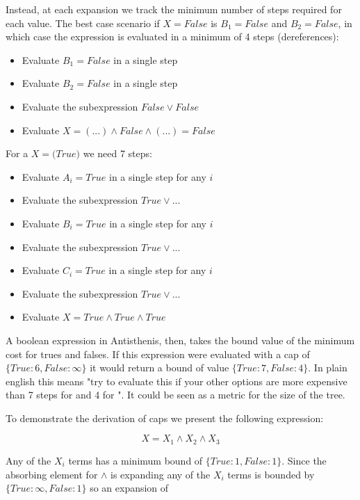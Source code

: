 Instead, at each expansion we track the minimum number of steps
required for each value. The best case scenario if
\(X = \mathit{False}\) is \(B_1 = False\) and \(B_2 = False\), in
which case the expression is evaluated in a minimum of 4 steps
(dereferences):

\begin{itemize}
\item Evaluate \(B_1 = False\) in a single step
\item Evaluate \(B_2 = False\) in a single step
\item Evaluate the subexpression \(False \lor False\)
\item Evaluate \(X = (...) \land False \land (...) = False\)
\end{itemize}

For a \(X = \mathit(True)\) we need 7 steps:

\begin{itemize}
\item Evaluate \(A_i = True\) in a single step for any \(i\)
\item Evaluate the subexpression \(True \lor ...\)
\item Evaluate \(B_i = True\) in a single step for any \(i\)
\item Evaluate the subexpression \(True \lor ...\)
\item Evaluate \(C_i = True\) in a single step for any \(i\)
\item Evaluate the subexpression \(True \lor ...\)
\item Evaluate \(X = True \land True \land True\)
\end{itemize}

A boolean expression in Antisthenis, then, takes the bound value of
the minimum cost for trues and falses. If this expression were
evaluated with a cap of \(\{True: 6, False: \infty \}\) it would
return a bound of value \(\{True: 7, False: 4 \}\). In plain english
this means "try to evaluate this if your other options are more
expensive than 7 steps for  and 4 for ". It
could be seen as a metric for the size of the tree.

To demonstrate the derivation of caps we present the following
expression:

\[
X = X_1 \land X_2 \land X_3
\]

Any of the \(X_i\) terms has a minimum bound of
\(\{True: 1, False: 1 \}\). Since the absorbing element for \(\land\)
is  expanding any of the \(X_i\) terms is bounded by
\(\{True: \infty, False: 1 \}\) so an expansion of

